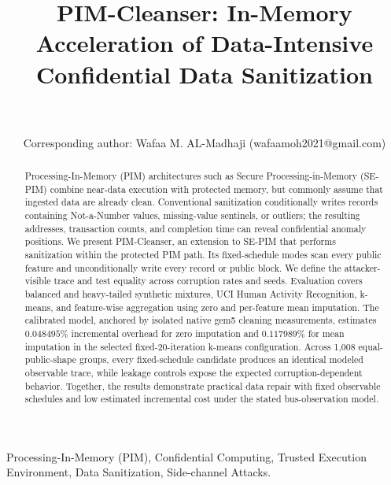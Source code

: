 \documentclass[conference]{IEEEtran}
\begin{document}
\title{PIM-Cleanser: In-Memory Acceleration of Data-Intensive Confidential Data Sanitization}

\author{%
\\[-0.15em]
\\[-0.25em]
{\small Corresponding author: Wafaa M. AL-Madhaji (wafaamoh2021@gmail.com)}%
}

\maketitle

\begin{abstract}
Processing-In-Memory (PIM) architectures such as Secure Processing-in-Memory
(SE-PIM) combine near-data execution with protected memory, but commonly assume
that ingested data are already clean. Conventional sanitization conditionally
writes records containing Not-a-Number values, missing-value sentinels, or
outliers; the resulting addresses, transaction counts, and completion time can
reveal confidential anomaly positions. We present PIM-Cleanser, an extension to
SE-PIM that performs sanitization within the protected PIM path. Its
fixed-schedule modes scan every public feature and unconditionally write every
record or public block. We define the attacker-visible trace and test equality
across corruption rates and seeds. Evaluation covers balanced and heavy-tailed
synthetic mixtures, UCI Human Activity Recognition, k-means, and feature-wise
aggregation using zero and per-feature mean imputation. The calibrated model,
anchored by isolated native gem5 cleaning measurements, estimates
$0.048495\%$ incremental overhead for zero imputation and $0.117989\%$ for mean
imputation in the selected fixed-20-iteration k-means configuration. Across
1,008 equal-public-shape groups, every fixed-schedule candidate produces an
identical modeled observable trace, while leakage controls expose the expected
corruption-dependent behavior. Together, the results demonstrate practical
data repair with fixed observable schedules and low estimated incremental cost
under the stated bus-observation model.
\end{abstract}

\begin{IEEEkeywords}
Processing-In-Memory (PIM), Confidential Computing, Trusted Execution Environment, Data Sanitization, Side-channel Attacks.
\end{IEEEkeywords}
\end{document}
